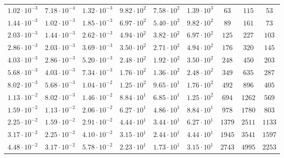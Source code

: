 \begin{tabular}{c c c c c c c c c}
$1.02{\cdot} 10^{-3}$ & $7.18{\cdot} 10^{-4}$ & $1.32{\cdot} 10^{-3}$ & $9.82{\cdot} 10^{2}$ & $7.58{\cdot} 10^{2}$ & $1.39{\cdot} 10^{3}$ & $        63$ & $       115$ & $     53$\\
$1.44{\cdot} 10^{-3}$ & $1.02{\cdot} 10^{-3}$ & $1.85{\cdot} 10^{-3}$ & $6.97{\cdot} 10^{2}$ & $5.40{\cdot} 10^{2}$ & $9.82{\cdot} 10^{2}$ & $        89$ & $       161$ & $     73$\\
$2.03{\cdot} 10^{-3}$ & $1.44{\cdot} 10^{-3}$ & $2.62{\cdot} 10^{-3}$ & $4.94{\cdot} 10^{2}$ & $3.82{\cdot} 10^{2}$ & $6.97{\cdot} 10^{2}$ & $       125$ & $       227$ & $    103$\\
$2.86{\cdot} 10^{-3}$ & $2.03{\cdot} 10^{-3}$ & $3.69{\cdot} 10^{-3}$ & $3.50{\cdot} 10^{2}$ & $2.71{\cdot} 10^{2}$ & $4.94{\cdot} 10^{2}$ & $       176$ & $       320$ & $    145$\\
$4.03{\cdot} 10^{-3}$ & $2.86{\cdot} 10^{-3}$ & $5.20{\cdot} 10^{-3}$ & $2.48{\cdot} 10^{2}$ & $1.92{\cdot} 10^{2}$ & $3.50{\cdot} 10^{2}$ & $       248$ & $       450$ & $    203$\\
$5.68{\cdot} 10^{-3}$ & $4.03{\cdot} 10^{-3}$ & $7.34{\cdot} 10^{-3}$ & $1.76{\cdot} 10^{2}$ & $1.36{\cdot} 10^{2}$ & $2.48{\cdot} 10^{2}$ & $       349$ & $       635$ & $    287$\\
$8.02{\cdot} 10^{-3}$ & $5.68{\cdot} 10^{-3}$ & $1.04{\cdot} 10^{-2}$ & $1.25{\cdot} 10^{2}$ & $9.65{\cdot} 10^{1}$ & $1.76{\cdot} 10^{2}$ & $       492$ & $       896$ & $    405$\\
$1.13{\cdot} 10^{-2}$ & $8.02{\cdot} 10^{-3}$ & $1.46{\cdot} 10^{-2}$ & $8.84{\cdot} 10^{1}$ & $6.85{\cdot} 10^{1}$ & $1.25{\cdot} 10^{2}$ & $       694$ & $      1262$ & $    569$\\
$1.59{\cdot} 10^{-2}$ & $1.13{\cdot} 10^{-2}$ & $2.06{\cdot} 10^{-2}$ & $6.27{\cdot} 10^{1}$ & $4.86{\cdot} 10^{1}$ & $8.84{\cdot} 10^{1}$ & $       978$ & $      1780$ & $    803$\\
$2.25{\cdot} 10^{-2}$ & $1.59{\cdot} 10^{-2}$ & $2.91{\cdot} 10^{-2}$ & $4.44{\cdot} 10^{1}$ & $3.44{\cdot} 10^{1}$ & $6.27{\cdot} 10^{1}$ & $      1379$ & $      2511$ & $   1133$\\
$3.17{\cdot} 10^{-2}$ & $2.25{\cdot} 10^{-2}$ & $4.10{\cdot} 10^{-2}$ & $3.15{\cdot} 10^{1}$ & $2.44{\cdot} 10^{1}$ & $4.44{\cdot} 10^{1}$ & $      1945$ & $      3541$ & $   1597$\\
$4.48{\cdot} 10^{-2}$ & $3.17{\cdot} 10^{-2}$ & $5.78{\cdot} 10^{-2}$ & $2.23{\cdot} 10^{1}$ & $1.73{\cdot} 10^{1}$ & $3.15{\cdot} 10^{1}$ & $      2743$ & $      4995$ & $   2253$\\

\end{tabular}
